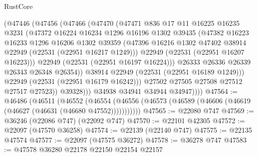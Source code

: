 \begin{lexlean}{RustCore}
\begin{coremodule}
                    (@47446
                      (@47456
                        (@47466
                          (@47470
                            (@47471
                              @836
                              @17
                              @11
                              @16225
                              @16235
                              @3231
                              (@47372
                                @16224
                                @16234
                                @1296
                                @16196
                                @1302
                                @39435
                                (@47382
                                  @16223
                                  @16233
                                  @1296
                                  @16206
                                  @1302
                                  @39359
                                  (@47396
                                    @16216
                                    @1302
                                    @47402
                                    @38914
                                    @22949
                                    (@22531 (@22951 @16217 @1249)))
                                  @22949
                                  (@22531 (@22951 @16207 @16223)))
                                @22949
                                (@22531 (@22951 @16197 @16224)))
                              @26333
                              @26336
                              @26339
                              @26343
                              @26348
                              @26354))
                          @38914
                          @22949
                          (@22531 (@22951 @16189 @1249)))
                        @22949
                        (@22531 (@22951 @16179 @16242)))
                      @27502
                      @27505
                      @27508
                      @27512
                      @27517
                      @27523))
                  @39328)))
            @34938
            @34941
            @34944
            @34947))))
@47564 := @46486
    (@46511
      (@46552
        (@46554 (@46556 (@46573 (@46589 (@46606 (@46619 (@46627 (@46631 (@46680 @47552)))))))))))
@47565 := @22080 @747
@47569 := @36246 (@22086 @747) (@22092 @747)
@47570 := @22101 @42305
@47572 := @22097 (@47570 @36258)
@47574 := @22139 (@22140 @747)
@47575 := @22135 @47574
@47577 := @22097 (@47575 @36272)
@47578 := @36278 @747
@47583 := @47578 @36280 @22178 @22150 @22154 @22157

\end{coremodule}
\end{lexlean}
